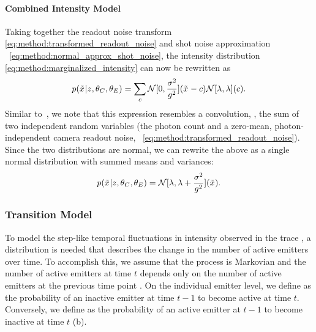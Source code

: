 \paragraph{Combined Intensity Model}

Taking together the readout noise transform
\eqref{eq:method:transformed_readout_noise} and shot noise approximation ~\eqref{eq:method:normal_approx_shot_noise}, the
intensity distribution \eqref{eq:method:marginalized_intensity} can now be
rewritten as
%
  \begin{equation}
    p(\tilde{x}_{}|z_{},\theta_C, \theta_E)
      = \sum_c
        \mathcal{N}[0, \frac{\sigma^2}{g^2}](\tilde{x}_{} - c)
        \mathcal{N}[\lambda, \lambda](c)
    \text{.}
  \end{equation}
  Similar to~\cite{huang_video-rate_2013}, we note that this expression
  resembles a convolution, \ie, the sum of two independent random variables
  (the photon count \photons and a zero-mean, photon-independent camera readout
  noise, ~\eqref{eq:method:transformed_readout_noise}). Since the two distributions are normal, we can rewrite
  the above as a single normal distribution with summed means and variances:
  \begin{equation}
    p(\tilde{x}_{}|z_{},\theta_C, \theta_E)
      = \mathcal{N}[\lambda, \lambda + \frac{\sigma^2}{g^2}](\tilde{x}_{})
    \text{.}
    \label{eq:method:combined_intensity}
  \end{equation}

\subsubsection{Transition Model}

To model the step-like temporal fluctuations in intensity observed in
the trace \trace, a distribution is needed that describes the change in the
number of active emitters \z{} over time.
  To accomplish this, we assume that the process is Markovian and the number of active
  emitters  at time $t$ depends only on the number of active emitters at
  the previous time point .
  On the individual emitter level, we define \pon as the probability of an
  inactive emitter at time $t-1$ to become active at time $t$.
  Conversely, we define \poff as the probability of an active emitter at $t-1$
  to become inactive at time $t$ (b).


